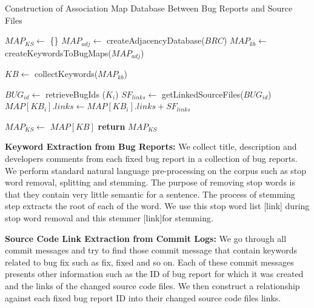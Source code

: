 \documentclass{sig-alternate}
\begin{document}
\begin{algorithm}[!t]
\caption{Construction of Association Map Database Between Bug Reports and Source Files}
\label{map}
\begin{algorithmic}[1]
\State $MAP_{KS} \gets$ \{\}
\State $MAP_{adj} \gets$ createAdjacencyDatabase($BRC$)
\State $MAP_{kb} \gets$ createKeywordsToBugMaps($MAP_{adj}$)

\State $KB \gets$ collectKeywords($MAP_{kb}$)

\State $BUG_{id} \gets$ retrieveBugIds ($K_i$)
\State $SF_{links} \gets$ getLinkedSourceFiles($BUG_{id}$)
\State $MAP[KB_i].links \gets MAP[KB_{i}].links + SF_{links}$
\EndFor
\EndFor

\State $MAP_{KS} \gets$ $MAP[KB]$ 
\State \textbf{return} $MAP_{KS}$
\EndProcedure
\end{algorithmic}
\end{algorithm}



\textbf{Keyword Extraction from Bug Reports:} We collect title, description and developers comments from each fixed bug report in a collection of bug reports. We perform standard natural language pre-processing on the corpus such as stop word removal, splitting and stemming. The purpose of removing stop words is that they contain very little semantic for a sentence. The process of stemming step extracts the root of each of the word. We use this stop word list [link] during stop word removal and this stemmer [link]for stemming. 

\textbf{Source Code Link Extraction from Commit Logs:}
We go through all commit messages and try to find those commit message that contain keywords related to bug fix such as fix, fixed and so on. Each of these commit messages presents other information such as the ID of bug report for which it was created and the links of the changed source code files. We then construct a relationship against each fixed bug report ID into their changed source code files links.
\end{document}
